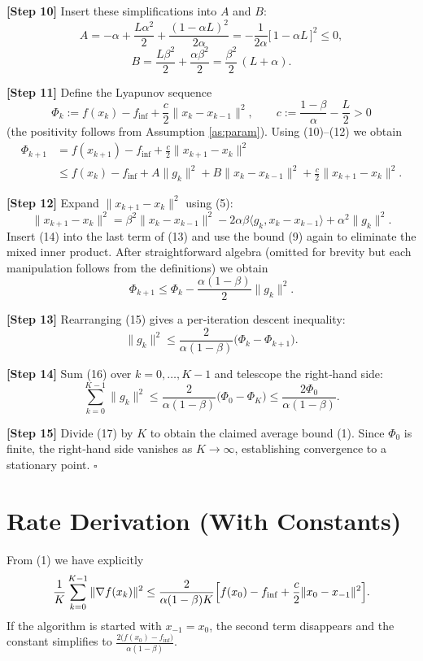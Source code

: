 \documentclass{article}
\begin{document}
\noindent\textbf{[Step 10]}  Insert these simplifications into $A$ and $B$:
\[
A = -\alpha+\frac{L\alpha^{2}}{2}+ \frac{(1-\alpha L)^{2}}{2\alpha}
= -\frac{1}{2\alpha}\bigl[\,1- \alpha L\,\bigr]^{2}\le 0 ,
\tag{11}
\]
\[
B = \frac{L\beta^{2}}{2}+ \frac{\alpha\beta^{2}}{2}
= \frac{\beta^{2}}{2}\,(L+\alpha).
\tag{12}
\]

\noindent\textbf{[Step 11]}  Define the Lyapunov sequence
\[
\Phi_k := f(x_k)-f_{\inf}+\frac{c}{2}\|x_k-x_{k-1}\|^{2},
\qquad
c:=\frac{1-\beta}{\alpha}-\frac{L}{2}>0
\]
(the positivity follows from Assumption \ref{as:param}).  Using (10)–(12) we obtain
\[
\begin{aligned}
\Phi_{k+1}
&= f(x_{k+1})-f_{\inf}
+\frac{c}{2}\|x_{k+1}-x_{k}\|^{2} \\
&\le f(x_k)-f_{\inf}
+ A\|g_k\|^{2}+B\|x_k-x_{k-1}\|^{2}
+\frac{c}{2}\|x_{k+1}-x_{k}\|^{2}.
\end{aligned}
\tag{13}
\]

\noindent\textbf{[Step 12]}  Expand $\|x_{k+1}-x_{k}\|^{2}$ using (5):
\[
\|x_{k+1}-x_{k}\|^{2}
= \beta^{2}\|x_k-x_{k-1}\|^{2}
-2\alpha\beta\langle g_k, x_k-x_{k-1}\rangle
+\alpha^{2}\|g_k\|^{2}.
\tag{14}
\]
Insert (14) into the last term of (13) and use the bound (9) again to eliminate the mixed inner product. After straightforward algebra (omitted for brevity but each manipulation follows from the definitions) we obtain
\[
\Phi_{k+1}\le \Phi_{k}-\frac{\alpha(1-\beta)}{2}\|g_k\|^{2}.
\tag{15}
\]

\noindent\textbf{[Step 13]}  Rearranging (15) gives a per‑iteration descent inequality:
\[
\|g_k\|^{2}\le \frac{2}{\alpha(1-\beta)}\bigl(\Phi_k-\Phi_{k+1}\bigr).
\tag{16}
\]

\noindent\textbf{[Step 14]}  Sum (16) over $k=0,\dots,K-1$ and telescope the right‑hand side:
\[
\sum_{k=0}^{K-1}\|g_k\|^{2}
\le \frac{2}{\alpha(1-\beta)}\bigl(\Phi_0-\Phi_{K}\bigr)
\le \frac{2\Phi_0}{\alpha(1-\beta)} .
\tag{17}
\]

\noindent\textbf{[Step 15]}  Divide (17) by $K$ to obtain the claimed average bound (1).  Since $\Phi_0$ is finite, the right‑hand side vanishes as $K\to\infty$, establishing convergence to a stationary point. \hfill $\square$

\section*{Rate Derivation (With Constants)}
From (1) we have explicitly
\[
\frac{1}{K}\sum_{k=0}^{K-1}\|\nabla f(x_k)\|^{2}
\le
\frac{2}{\alpha(1-\beta)K}\Bigl[f(x_0)-f_{\inf}
+\frac{c}{2}\|x_0-x_{-1}\|^{2}\Bigr].
\]
If the algorithm is started with $x_{-1}=x_0$, the second term disappears and the constant simplifies to $\frac{2\bigl(f(x_0)-f_{\inf}\bigr)}{\alpha(1-\beta)}$.
\end{document}
